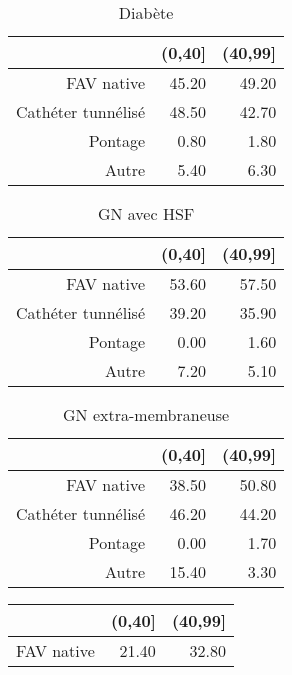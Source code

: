 \documentclass[11pt,a4paper]{article}\usepackage[]{graphicx}\usepackage[]{color}
\begin{document}
\begin{multicols}{2}
\begin{table}[H]
\centering
\begin{tabular}{rrr}
  \hline
 & (0,40] & (40,99] \\ 
  \hline
FAV native & 45.20 & 49.20 \\ 
  Cathéter tunnélisé & 48.50 & 42.70 \\ 
  Pontage & 0.80 & 1.80 \\ 
  Autre & 5.40 & 6.30 \\ 
   \hline
\end{tabular}
\caption{Diabète} 
\end{table}
\begin{table}[H]
\centering
\begin{tabular}{rrr}
  \hline
 & (0,40] & (40,99] \\ 
  \hline
FAV native & 53.60 & 57.50 \\ 
  Cathéter tunnélisé & 39.20 & 35.90 \\ 
  Pontage & 0.00 & 1.60 \\ 
  Autre & 7.20 & 5.10 \\ 
   \hline
\end{tabular}
\caption{GN avec HSF} 
\end{table}
\begin{table}[H]
\centering
\begin{tabular}{rrr}
  \hline
 & (0,40] & (40,99] \\ 
  \hline
FAV native & 38.50 & 50.80 \\ 
  Cathéter tunnélisé & 46.20 & 44.20 \\ 
  Pontage & 0.00 & 1.70 \\ 
  Autre & 15.40 & 3.30 \\ 
   \hline
\end{tabular}
\caption{GN extra-membraneuse} 
\end{table}
\begin{table}[H]
\centering
\begin{tabular}{rrr}
  \hline
 & (0,40] & (40,99] \\ 
  \hline
FAV native & 21.40 & 32.80 \\ 

\end{tabular}
\end{table}
\end{multicols}
\end{document}
